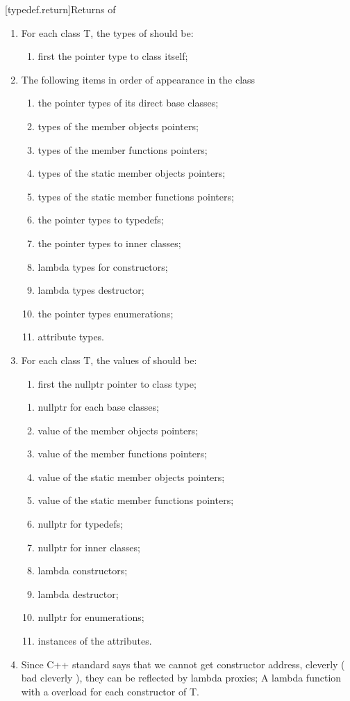 [typedef.return]{Returns of  }
\begin{enumerate}
\item For each class T, the types of  should be:
\begin{enumerate}
\item first the pointer type to class itself; 
\end{enumerate}
\item The following items in order of appearance in the class
\begin{enumerate}
\item the pointer types of its direct base classes;
\item types of the member objects pointers;
\item types of the member functions pointers; 
\item types of the static member objects pointers;
\item types of the static member functions pointers; 
\item the pointer types to typedefs;
\item the pointer types to inner classes;
\item lambda types for constructors;
\item lambda types destructor;
\item the pointer types enumerations;
\item attribute types.
\end{enumerate}
\item For each class T, the values of  should be:
\begin{enumerate}
\item first the nullptr pointer to class type; 
\end{enumerate}
\begin{enumerate}
\item nullptr for each base classes;
\item value of the member objects pointers;
\item value of the member functions pointers; 
\item value of the static member objects pointers;
\item value of the static member functions pointers; 
\item nullptr for typedefs;
\item nullptr for inner classes;
\item lambda constructors;
\item lambda destructor;
\item nullptr for enumerations;
\item instances of the attributes.
\end{enumerate}
\item Since C++ standard says that we cannot get constructor address, cleverly ( bad cleverly ), they can be reflected by lambda proxies; A lambda function with a  overload for each constructor of T.


\end{enumerate}
